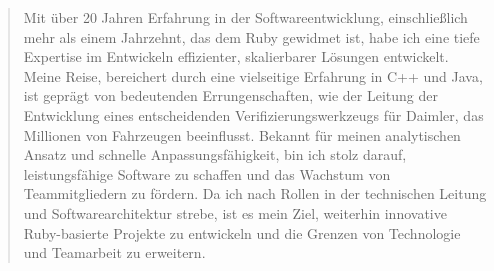 \begin{minipage}{\linewidth}
\begin{quote}
Mit über 20 Jahren Erfahrung in der Softwareentwicklung, einschließlich mehr als einem Jahrzehnt, das dem Ruby gewidmet ist, habe ich eine tiefe Expertise im Entwickeln effizienter, skalierbarer Lösungen entwickelt. 
Meine Reise, bereichert durch eine vielseitige Erfahrung in C++ und Java, ist geprägt von bedeutenden Errungenschaften, wie der Leitung der Entwicklung eines entscheidenden Verifizierungswerkzeugs für Daimler, das Millionen von Fahrzeugen beeinflusst. 
Bekannt für meinen analytischen Ansatz und schnelle Anpassungsfähigkeit, bin ich stolz darauf, leistungsfähige Software zu schaffen und das Wachstum von Teammitgliedern zu fördern. 
Da ich nach Rollen in der technischen Leitung und Softwarearchitektur strebe, ist es mein Ziel, weiterhin innovative Ruby-basierte Projekte zu entwickeln und die Grenzen von Technologie und Teamarbeit zu erweitern.
\end{quote}
\end{minipage}
